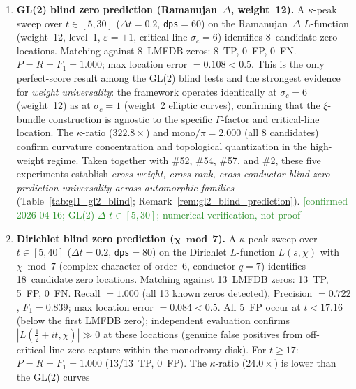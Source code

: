 \documentclass[11pt, a4paper]{article}
\theoremstyle{definition}
\theoremstyle{plain}
\begin{document}
\begin{enumerate}
        \textcolor{ForestGreen}{[confirmed 2026-04-16; GL(2) 37a1 $t\in[5,30]$; numerical verification, not proof]}
  \item \textbf{GL(2) blind zero prediction (Ramanujan~$\Delta$, weight~12).}
        A $\kappa$-peak sweep over $t\in[5,30]$ ($\Delta t = 0.2$,
        \texttt{dps}$=60$) on the Ramanujan~$\Delta$ $L$-function
        (weight~12, level~1, $\varepsilon = +1$, critical line $\sigma_c = 6$)
        identifies 8~candidate zero locations.
        Matching against 8~LMFDB zeros: 8~TP, 0~FP, 0~FN.
        $P = R = F_1 = 1.000$; max location error $= 0.108 < 0.5$.
        This is the only perfect-score result among the GL(2) blind tests
        and the strongest evidence for \emph{weight universality}:
        the framework operates identically at $\sigma_c = 6$
        (weight~12) as at $\sigma_c = 1$ (weight~2 elliptic curves),
        confirming that the $\xi$-bundle construction is agnostic to the
        specific $\Gamma$-factor and critical-line location.
        The $\kappa$-ratio ($322.8\times$) and mono$/\pi = 2.000$
        (all 8 candidates) confirm curvature concentration and
        topological quantization in the high-weight regime.
        Taken together with \#52, \#54, \#57, and \#2, these five experiments
        establish \emph{cross-weight, cross-rank, cross-conductor
        blind zero prediction universality across automorphic families}
        (Table~\ref{tab:gl1_gl2_blind};
        Remark~\ref{rem:gl2_blind_prediction}).
        \textcolor{ForestGreen}{[confirmed 2026-04-16; GL(2) $\Delta$ $t\in[5,30]$; numerical verification, not proof]}
  \item \textbf{Dirichlet blind zero prediction ($\boldsymbol{\chi\bmod 7}$).}
        A $\kappa$-peak sweep over $t\in[5,40]$ ($\Delta t=0.2$,
        \texttt{dps}$=80$) on the Dirichlet $L$-function
        $L(s,\chi)$ with $\chi\bmod 7$ (complex character of order~6,
        conductor $q=7$) identifies 18~candidate zero locations.
        Matching against 13~LMFDB zeros: 13~TP, 5~FP, 0~FN.
        Recall $= 1.000$ (all 13 known zeros detected),
        Precision $= 0.722$, $F_1 = 0.839$;
        max location error $= 0.084 < 0.5$.
        All 5~FP occur at $t < 17.16$ (below the first LMFDB zero);
        independent evaluation confirms $|L(\tfrac{1}{2}+it,\chi)| \gg 0$
        at these locations (genuine false positives from
        off-critical-line zero capture within the monodromy disk).
        For $t \geq 17$: $P = R = F_1 = 1.000$ (13/13~TP, 0~FP).
        The $\kappa$-ratio ($24.0\times$) is lower than the GL(2) curves

\end{enumerate}
\end{document}
